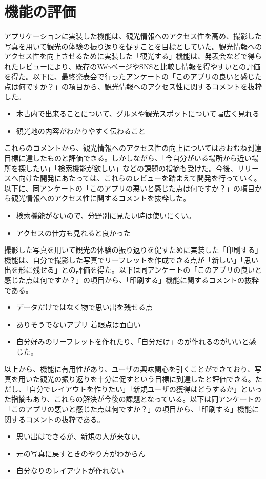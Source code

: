\section{機能の評価}
アプリケーションに実装した機能は、観光情報へのアクセス性を高め、撮影した写真を用いて観光の体験の振り返りを促すことを目標としていた。観光情報へのアクセス性を向上させるために実装した「観光する」機能は、発表会などで得られたレビューにより、既存のWebページやSNSと比較し情報を得やすいとの評価を得た。以下に、最終発表会で行ったアンケートの「このアプリの良いと感じた点は何ですか？」の項目から、観光情報へのアクセス性に関するコメントを抜粋した。
\begin{itemize}
\item 木古内で出来ることについて、グルメや観光スポットについて幅広く見れる
\item 観光地の内容がわかりやすく伝わること
\end{itemize}
これらのコメントから、観光情報へのアクセス性の向上についてはおおむね到達目標に達したものと評価できる。しかしながら、「今自分がいる場所から近い場所を探したい」「検索機能が欲しい」などの課題の指摘も受けた。今後、リリースへ向けた開発にあたっては、これらのレビューを踏まえて開発を行っていく。以下に、同アンケートの「このアプリの悪いと感じた点は何ですか？」の項目から観光情報へのアクセス性に関するコメントを抜粋した。
\begin{itemize}
\item 検索機能がないので、分野別に見たい時は使いにくい。
\item アクセスの仕方も見れると良かった
\end{itemize}
撮影した写真を用いて観光の体験の振り返りを促すために実装した「印刷する」機能は、自分で撮影した写真でリーフレットを作成できる点が「新しい」「思い出を形に残せる」との評価を得た。以下は同アンケートの「このアプリの良いと感じた点は何ですか？」の項目から、「印刷する」機能に関するコメントの抜粋である。
\begin{itemize}
\item データだけではなく物で思い出を残せる点
\item ありそうでないアプリ 着眼点は面白い
\item 自分好みのリーフレットを作れたり、「自分だけ」のが作れるのがいいと感じた。
\end{itemize}
以上から、機能に有用性があり、ユーザの興味関心を引くことができており、写真を用いた観光の振り返りを十分に促すという目標に到達したと評価できる。ただし、「自分でレイアウトを作りたい」「新規ユーザの獲得はどうするか」といった指摘もあり、これらの解決が今後の課題となっている。以下は同アンケートの「このアプリの悪いと感じた点は何ですか？」の項目から、「印刷する」機能に関するコメントの抜粋である。
\begin{itemize}
\item 思い出はできるが、新規の人が来ない。
\item 元の写真に戻すときのやり方がわからん
\item 自分なりのレイアウトが作れない
\end{itemize}


